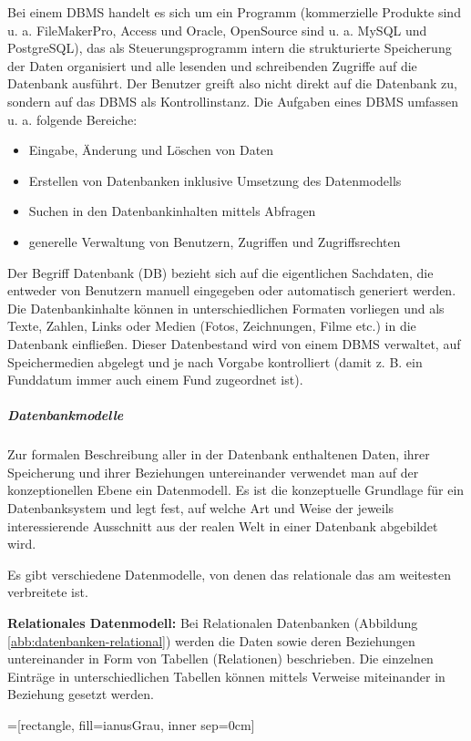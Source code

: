 Bei einem DBMS handelt es sich um ein Programm (kommerzielle Produkte sind u. a. FileMakerPro, Access und Oracle, OpenSource sind u. a. MySQL und PostgreSQL), das als Steuerungsprogramm intern die strukturierte Speicherung der Daten organisiert und alle lesenden und schreibenden Zugriffe auf die Datenbank ausführt. Der Benutzer greift also nicht direkt auf die Datenbank zu, sondern auf das DBMS als Kontrollinstanz. Die Aufgaben eines DBMS umfassen u. a. folgende Bereiche:

\begin{itemize}
	\item Eingabe, Änderung und Löschen von Daten
	\item Erstellen von Datenbanken inklusive Umsetzung des Datenmodells
	\item Suchen in den Datenbankinhalten mittels Abfragen
	\item generelle Verwaltung von Benutzern, Zugriffen und Zugriffsrechten
\end{itemize}

Der Begriff Datenbank (DB) bezieht sich auf die eigentlichen Sachdaten, die entweder von Benutzern manuell eingegeben oder automatisch generiert werden. Die Datenbankinhalte können in unterschiedlichen Formaten vorliegen und als Texte, Zahlen, Links oder Medien (Fotos, Zeichnungen, Filme etc.) in die Datenbank einfließen. Dieser Datenbestand wird von einem DBMS verwaltet, auf Speichermedien abgelegt und je nach Vorgabe kontrolliert (damit z. B. ein Funddatum immer auch einem Fund zugeordnet ist).


\subparagraph{Datenbankmodelle}
Zur formalen Beschreibung aller in der Datenbank enthaltenen Daten, ihrer Speicherung und ihrer Beziehungen untereinander verwendet man auf der konzeptionellen Ebene ein Datenmodell. Es ist die konzeptuelle Grundlage für ein Datenbanksystem und legt fest, auf welche Art und Weise der jeweils interessierende Ausschnitt aus der realen Welt in einer Datenbank abgebildet wird.
 
Es gibt verschiedene Datenmodelle, von denen das relationale das am weitesten verbreitete ist.

{\bfseries Relationales Datenmodell:} Bei Relationalen Datenbanken (Abbildung \ref{abb:datenbanken-relational}) werden die Daten sowie deren Beziehungen untereinander in Form von Tabellen (Relationen) beschrieben. Die einzelnen Einträge in unterschiedlichen Tabellen können mittels Verweise miteinander in Beziehung gesetzt werden.

=[rectangle,
	fill=ianusGrau,
	inner sep=0cm]

